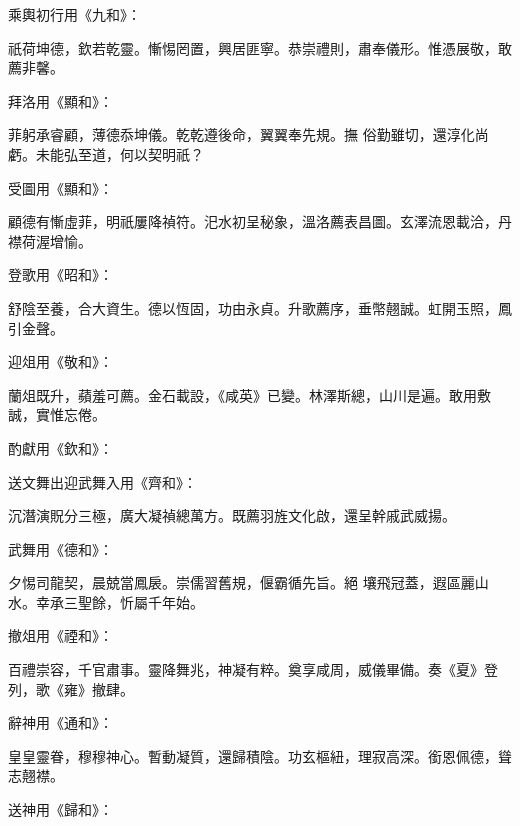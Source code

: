 \begin{pinyinscope}
 乘輿初行用《九和》：



 祇荷坤德，欽若乾靈。慚惕罔置，興居匪寧。恭崇禮則，肅奉儀形。惟憑展敬，敢薦非馨。



 拜洛用《顯和》：



 菲躬承睿顧，薄德忝坤儀。乾乾遵後命，翼翼奉先規。撫
 俗勤雖切，還淳化尚虧。未能弘至道，何以契明祇？



 受圖用《顯和》：



 顧德有慚虛菲，明祇屢降禎符。汜水初呈秘象，溫洛薦表昌圖。玄澤流恩載洽，丹襟荷渥增愉。



 登歌用《昭和》：



 舒陰至養，合大資生。德以恆固，功由永貞。升歌薦序，垂幣翹誠。虹開玉照，鳳引金聲。



 迎俎用《敬和》：



 蘭俎既升，蘋羞可薦。金石載設，《咸英》已變。林澤斯總，山川是遍。敢用敷誠，實惟忘倦。



 酌獻用《欽和》：



 送文舞出迎武舞入用《齊和》：



 沉潛演貺分三極，廣大凝禎總萬方。既薦羽旌文化啟，還呈幹戚武威揚。



 武舞用《德和》：



 夕惕司龍契，晨兢當鳳扆。崇儒習舊規，偃霸循先旨。絕
 壤飛冠蓋，遐區麗山水。幸承三聖餘，忻屬千年始。



 撤俎用《禋和》：



 百禮崇容，千官肅事。靈降舞兆，神凝有粹。奠享咸周，威儀畢備。奏《夏》登列，歌《雍》撤肆。



 辭神用《通和》：



 皇皇靈眷，穆穆神心。暫動凝質，還歸積陰。功玄樞紐，理寂高深。銜恩佩德，聳志翹襟。



 送神用《歸和》：




\end{pinyinscope}
